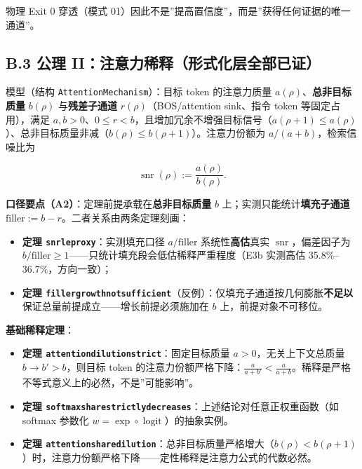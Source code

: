 \documentclass[
]{ctexart}
\providecommand{\tightlist}{%
  \setlength{\itemsep}{0pt}\setlength{\parskip}{0pt}}
\renewcommand{\_}{\discretionary{}{}{\textunderscore}}
\begin{document}
物理 Exit 0 穿透（模式
01）因此不是''提高置信度''，而是''获得任何证据的唯一通道''。

\subsection{B.3 公理
II：注意力稀释（形式化层全部已证）}\label{b.3-ux516cux7406-iiux6ce8ux610fux529bux7a00ux91caux5f62ux5f0fux5316ux5c42ux5168ux90e8ux5df2ux8bc1}

模型（结构 \texttt{AttentionMechanism}）：目标 token 的注意力质量
\(a(\rho)\)、\textbf{总非目标质量} \(b(\rho)\) 与\textbf{残差子通道}
\(r(\rho)\)（BOS/attention sink、指令 token 等固定占用），满足
\(a,b>0\)、\(0\le r<b\)，且增加冗余不增强目标信号（\(a(\rho+1)\le a(\rho)\)）、总非目标质量非减（\(b(\rho)\le b(\rho+1)\)）。注意力份额为
\(a/(a+b)\)，检索信噪比为

\[\operatorname{snr}(\rho) := \frac{a(\rho)}{b(\rho)}.\]

\textbf{口径要点（A2）}：定理前提承载在\textbf{总非目标质量} \(b\)
上；实测只能统计\textbf{填充子通道}
\(\mathrm{filler} := b - r\)。二者关系由两条定理刻画：

\begin{itemize}
\tightlist
\item
  \textbf{定理 \texttt{snr\_le\_proxy}}：实测填充口径
  \(a/\mathrm{filler}\) 系统性\textbf{高估}真实
  \(\operatorname{snr}\)，偏差因子为
  \(b/\mathrm{filler}\ge 1\)------只统计填充段会低估稀释严重程度（E3b
  实测高估 35.8\%--36.7\%，方向一致）；
\item
  \textbf{定理
  \texttt{filler\_growth\_not\_sufficient}}（反例）：仅填充子通道按几何膨胀\textbf{不足以}保证总量前提成立------增长前提必须施加在
  \(b\) 上，前提对象不可移位。
\end{itemize}

\textbf{基础稀释定理}：

\begin{itemize}
\tightlist
\item
  \textbf{定理 \texttt{attention\_dilution\_strict}}：固定目标质量
  \(a>0\)，无关上下文总质量 \(b \to b' > b\)，则目标 token
  的注意力份额严格下降：\(\frac{a}{a+b'} < \frac{a}{a+b}\)。稀释是严格不等式意义上的必然，不是''可能影响''。
\item
  \textbf{定理
  \texttt{softmax\_share\_strictly\_decreases}}：上述结论对任意正权重函数（如
  softmax 参数化 \(w = \exp \circ \operatorname{logit}\)）的抽象实例。
\item
  \textbf{定理
  \texttt{attention\_share\_dilution}}：总非目标质量严格增大（\(b(\rho) < b(\rho+1)\)）时，注意力份额严格下降------定性稀释是注意力公式的代数必然。
\end{itemize}
\end{document}
